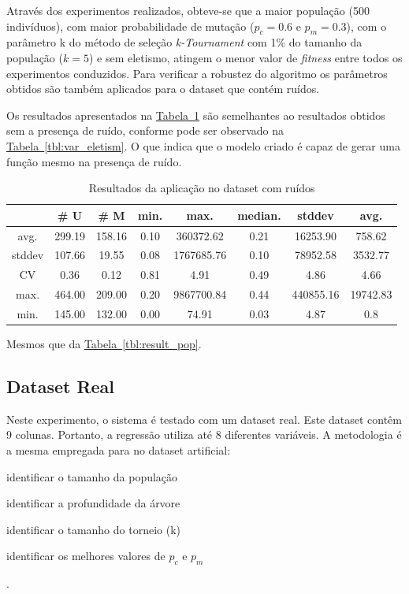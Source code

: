 \documentclass[a4paper]{paper}
\begin{document}
Através dos experimentos realizados, obteve-se que a maior população (500
indivíduos), com maior probabilidade de mutação ($p_c=0.6$ e $p_m=0.3$), com o
parâmetro k do método de seleção \textit{k-Tournament} com 1\% do tamanho da
população ($k=5$) e sem eletismo, atingem o menor valor de \textit{fitness}
entre todos os experimentos conduzidos. Para verificar a robustez do algoritmo
os parâmetros obtidos são também aplicados para o dataset que contém ruídos.

Os resultados apresentados na
\hyperref[tbl:noise_dataset]{Tabela~\ref*{tbl:noise_dataset}} são semelhantes ao
resultados obtidos sem a presença de ruído, conforme pode ser observado na
\hyperref[tbl:var_eletism]{Tabela~\ref*{tbl:var_eletism}}. O que indica que o
modelo criado é capaz de gerar uma função mesmo na presença de ruído.

\begin{table}
  \center
  \caption{Resultados da aplicação no dataset com ruídos}
  \label{tbl:noise_dataset}
  \begin{tabular}{| c | c | c | c | c | c | c | c |}
    \hline
    &  \# U & \# M & min. & max. & median. & stddev & avg. \\ \hline 
avg. & 299.19 & 158.16 & 0.10 & 360372.62 & 0.21 & 16253.90 & 758.62 \\ \hline 
stddev & 107.66 & 19.55 & 0.08 & 1767685.76 & 0.10 & 78952.58 & 3532.77 \\ \hline 
CV & 0.36 & 0.12 & 0.81 & 4.91 & 0.49 & 4.86 & 4.66 \\ \hline 
max. & 464.00 & 209.00 & 0.20 & 9867700.84 & 0.44 & 440855.16 & 19742.83 \\ \hline 
min. & 145.00 & 132.00 & 0.00 & 74.91 & 0.03 & 4.87 & 0.8 \\ \hline
  \end{tabular}
  \begin{minipage}{0.9\textwidth}
    {\footnotesize
      Mesmos que da \hyperref[tbl:result_pop]{Tabela~\ref*{tbl:result_pop}}.
    }
  \end{minipage}
\end{table}

\subsection{Dataset Real}
Neste experimento, o sistema é testado com um dataset real. Este dataset contêm
9 colunas. Portanto, a regressão utiliza até 8 diferentes variáveis. A metodologia
é a mesma empregada para no dataset artificial:
\begin{ilist}
\item identificar o tamanho da população
\item identificar a profundidade da árvore
\item identificar o tamanho do torneio (k)
  \item identificar os melhores valores de $p_c$ e $p_m$
\end{ilist}.
\end{document}
